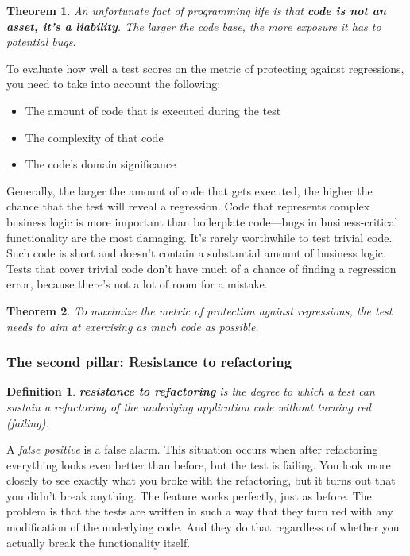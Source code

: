 \documentclass{article}
\newtheorem{definition}{Definition}
\newtheorem{theorem}{Theorem}
\begin{document}
\begin{theorem}
An unfortunate fact of programming life is that \textbf{code is not an asset, it’s a liability}. The larger the code base, the more exposure it has to potential bugs.
\end{theorem}

To evaluate how well a test scores on the metric of protecting against regressions, you need to take into account the following:
\begin{itemize}
	\item The amount of code that is executed during the test
	\item The complexity of that code
	\item The code’s domain significance
\end{itemize}	
Generally, the larger the amount of code that gets executed, the higher the chance that the test will reveal a regression. 
Code that represents complex business logic is more important than boilerplate code—bugs in business-critical functionality are the most damaging. It’s rarely worthwhile to test trivial code. Such code is short and doesn’t contain a substantial amount of business logic. Tests that cover trivial code don’t have much of a chance of finding a regression error, because there’s not a lot of room for a mistake.

\begin{theorem}
To maximize the metric of protection against regressions, the test needs to aim at exercising as much code as possible. 
\end{theorem}

\subsubsection{The second pillar: Resistance to refactoring}
\begin{definition}
\textbf{resistance to refactoring} is the degree to which a test can sustain a refactoring of the underlying application code without turning red (failing).
\end{definition}

A \textit{false positive} is a false alarm. This situation occurs when after refactoring everything looks even better than before, but the test is failing. You look more closely to see exactly what you broke with the refactoring, but it turns out that you didn’t break anything. The feature works perfectly, just as before. The problem is that the tests are written in such a way that they turn red with any modification of the underlying code. And they do that regardless of whether you actually break the functionality itself.
\end{document}
